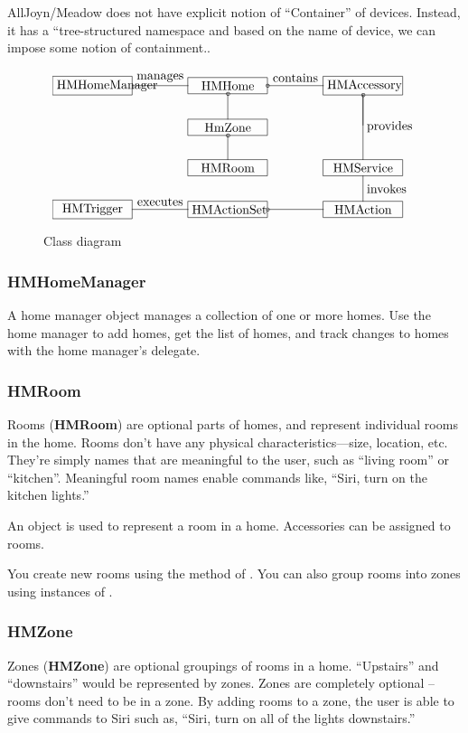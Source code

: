 \documentclass{myproc}
\begin{document}
\textcolor{red2}{AllJoyn/Meadow does not have explicit notion of ``Container''
  of devices. Instead, it has a ``tree-structured namespace and based on the
  name of device, we can impose some notion of containment.}.

\begin{figure*}[hpt]
{\scriptsize
\[\xymatrix@-0.4pc{
*+[F]\txt<2cm>{HMHomeManager} \ar@{-}[rr]^{\txt{manages}} &&
*+[F]\txt<2cm>{HMHome} \ar@{o-}[rr]^{\txt{contains}}\ar@{o-}[d] &&
*+[F]\txt<2cm>{HMAccessory} \ar@{-}[dd]^{\txt{provides}}
\ar@{o-}[d]\\ 
&&*+[F]\txt<2cm>{HmZone} \ar@{o-}[d]&& \\
&&*+[F]\txt<2cm>{HMRoom} && *+[F]\txt<2cm>{HMService} \ar@{-}[d]^{\txt{invokes}} \\
*+[F]\txt<2cm>{HMTrigger}\ar@{-}[rr]^{\txt{executes}} &&*+[F]\txt<2cm>{HMActionSet} \ar@{o-}[rr]&& *+[F]\txt<2cm>{HMAction} \\
}\]}
\caption{Class diagram}
\end{figure*}

\subsubsection{HMHomeManager}
A home manager object manages a collection of one or more homes. Use the home
manager to add homes, get the list of homes, and track changes to homes with
the home manager’s delegate. 

\subsubsection{HMRoom}
\textcolor{blue2}{Rooms (\textbf{HMRoom}) are optional parts of homes, and
  represent individual rooms in 
the home. Rooms don’t have any physical characteristics—size, location,
etc. They’re simply names that are meaningful to the user, such as “living
room” or ``kitchen''. Meaningful room names enable commands like, ``Siri, turn
on 
the kitchen lights.''  }

An  object is used to represent a room in a home. Accessories can
be assigned to rooms. 

You create new rooms using the  method of
. You can also group rooms into zones using instances of
.  

\subsubsection{HMZone}
\textcolor{blue2}{Zones (\textbf{HMZone}) are optional groupings of rooms in a
  home. ``Upstairs'' and ``downstairs'' would be represented by zones. Zones are
  completely optional -- rooms don’t need to be in a zone. By adding rooms to a
  zone, the user is able to give commands to Siri such as, ``Siri, turn on all
  of the lights downstairs.''  }
\end{document}
